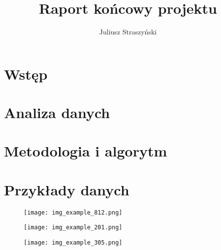 \documentclass[10pt, a4paper]{article}
\begin{document}
    \author{Juliusz Straszyński}
    \title{Raport końcowy projektu}
    \maketitle
    \tableofcontents


    \section{Wstęp}\label{sec:wstep}
    


    \section{Analiza danych}\label{sec:analiza-danych}
    


    \section{Metodologia i algorytm}\label{sec:metodologia-i-algorytm}
    
    \printbibliography
    \clearpage
    \appendix


    \section{Przykłady danych}\label{sec:raw-examples}
    \clearpage
    \begin{figure}[H]
        \texttt{[image: img\_example\_812.png]}
    \end{figure}
    \begin{figure}[H]
        \texttt{[image: img\_example\_201.png]}
    \end{figure}
    \begin{figure}[H]
        \texttt{[image: img\_example\_305.png]}
    \end{figure}
\end{document}
